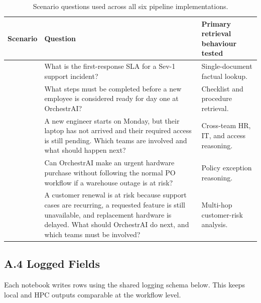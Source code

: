 \begin{table}[H]
\centering
\small
\begin{tabularx}{\textwidth}{>{\raggedright\arraybackslash}p{}>{\raggedright\arraybackslash}X>{\raggedright\arraybackslash}p{}}
\toprule
\textbf{Scenario} & \textbf{Question} & \textbf{Primary retrieval behaviour tested} \\
\midrule
1 & What is the first-response SLA for a Sev-1 support incident? & Single-document factual lookup. \\
2 & What steps must be completed before a new employee is considered ready for day one at OrchestrAI? & Checklist and procedure retrieval. \\
3 & A new engineer starts on Monday, but their laptop has not arrived and their required access is still pending. Which teams are involved and what should happen next? & Cross-team HR, IT, and access reasoning. \\
4 & Can OrchestrAI make an urgent hardware purchase without following the normal PO workflow if a warehouse outage is at risk? & Policy exception reasoning. \\
5 & A customer renewal is at risk because support cases are recurring, a requested feature is still unavailable, and replacement hardware is delayed. What should OrchestrAI do next, and which teams must be involved? & Multi-hop customer-risk analysis. \\
\bottomrule
\end{tabularx}
\caption{Scenario questions used across all six pipeline implementations.}
\label{tab:appendix-scenario-set}
\end{table}

\subsection*{A.4 Logged Fields}

Each notebook writes rows using the shared logging schema below. This keeps local and \ac{HPC} outputs comparable at the workflow level.


